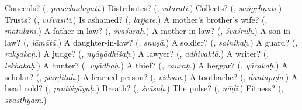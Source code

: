 \begin{tcolorbox}[breakable,colback=teal!4,colframe=teal!35!black,title={Before you move on}]
Conceals? (\textbf{}, \emph{pracchādayati}.) Distributes? (\textbf{}, \emph{vitarati}.) Collects? (\textbf{}, \emph{saṅgṛhṇāti}.) Trusts? (\textbf{}, \emph{viśvasiti}.) Is ashamed? (\textbf{}, \emph{lajjate}.) A mother's brother's wife? (\textbf{}, \emph{mātulānī}.) A father-in-law? (\textbf{}, \emph{śvaśuraḥ}.) A mother-in-law? (\textbf{}, \emph{śvaśrūḥ}.) A son-in-law? (\textbf{}, \emph{jāmātā}.) A daughter-in-law? (\textbf{}, \emph{snuṣā}.) A soldier? (\textbf{}, \emph{sainikaḥ}.) A guard? (\textbf{}, \emph{rakṣakaḥ}.) A judge? (\textbf{}, \emph{nyāyādhīśaḥ}.) A lawyer? (\textbf{}, \emph{adhivaktā}.) A writer? (\textbf{}, \emph{lekhakaḥ}.) A hunter? (\textbf{}, \emph{vyādhaḥ}.) A thief? (\textbf{}, \emph{cauraḥ}.) A beggar? (\textbf{}, \emph{yācakaḥ}.) A scholar? (\textbf{}, \emph{paṇḍitaḥ}.) A learned person? (\textbf{}, \emph{vidvān}.) A toothache? (\textbf{}, \emph{dantapīḍā}.) A head cold? (\textbf{}, \emph{pratiśyāyaḥ}.) Breath? (\textbf{}, \emph{śvāsaḥ}.) The pulse? (\textbf{}, \emph{nāḍī}.) Fitness? (\textbf{}, \emph{svāsthyam}.)
\end{tcolorbox}
